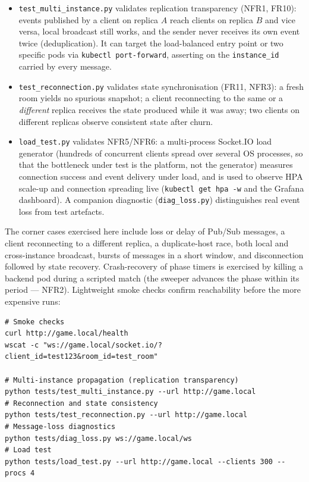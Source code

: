 \documentclass{scrartcl}
\begin{document}
\begin{itemize}
      \item \texttt{test\_multi\_instance.py} validates replication transparency
            (NFR1, FR10): events published by a client on replica $A$ reach clients on
            replica $B$ and vice versa, local broadcast still works, and the sender never
            receives its own event twice (deduplication). It can target the load-balanced
            entry point or two specific pods via \texttt{kubectl port-forward}, asserting on
            the \texttt{instance\_id} carried by every message.
      \item \texttt{test\_reconnection.py} validates state synchronisation (FR11,
            NFR3): a fresh room yields no spurious snapshot; a client reconnecting to the
            same or a \emph{different} replica receives the state produced while it was away;
            two clients on different replicas observe consistent state after churn.
      \item \texttt{load\_test.py} validates NFR5/NFR6: a multi-process Socket.IO load
            generator (hundreds of concurrent clients spread over several OS processes, so
            that the bottleneck under test is the platform, not the generator) measures
            connection success and event delivery under load, and is used to observe HPA
            scale-up and connection spreading live (\texttt{kubectl get hpa -w} and the
            Grafana dashboard). A companion diagnostic (\texttt{diag\_loss.py}) distinguishes
            real event loss from test artefacts.
\end{itemize}

The corner cases exercised here include loss or delay of Pub/Sub messages, a
client reconnecting to a different replica, a duplicate-host race, both local and
cross-instance broadcast, bursts of messages in a short window, and disconnection
followed by state recovery. Crash-recovery of phase timers is exercised by killing
a backend pod during a scripted match (the sweeper advances the phase within its
period --- NFR2). Lightweight smoke checks confirm reachability before the more
expensive runs:

\begin{verbatim}
# Smoke checks
curl http://game.local/health
wscat -c "ws://game.local/socket.io/?client_id=test123&room_id=test_room"

# Multi-instance propagation (replication transparency)
python tests/test_multi_instance.py --url http://game.local
# Reconnection and state consistency
python tests/test_reconnection.py --url http://game.local
# Message-loss diagnostics
python tests/diag_loss.py ws://game.local/ws
# Load test
python tests/load_test.py --url http://game.local --clients 300 --procs 4
\end{verbatim}
\end{document}
